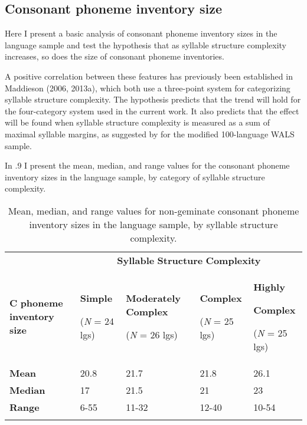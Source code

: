 \subsection{Consonant phoneme inventory size}\label{sec:4.4.1}

  Here I present a basic analysis of consonant phoneme inventory sizes in the language sample and test the hypothesis that as syllable structure complexity increases, so does the size of consonant phoneme inventories.

  A positive correlation between these features has previously been established in Maddieson (2006, 2013a), which both use a three-point system for categorizing syllable structure complexity. The hypothesis predicts that the trend will hold for the four-category system used in the current work. It also predicts that the effect will be found when syllable structure complexity is measured as a sum of maximal syllable margins, as suggested by \citet{Gordon2016} for the modified 100-language WALS sample.

  In .9 I present the mean, median, and range values for the consonant phoneme inventory sizes in the language sample, by category of syllable structure complexity. 

\begin{table}
\begin{tabularx}{\textwidth}{XXXXX}
 & \multicolumn{4}{c}{ \textbf{Syllable} \textbf{Structure} \textbf{Complexity}}\\
\lsptoprule
\textbf{C} \textbf{phoneme} \textbf{inventory} \textbf{size} & { \textbf{Simple}}

 (\textit{N} = 24 lgs) & { \textbf{Moderately} \textbf{Complex}}

 (\textit{N} = 26 lgs) & { \textbf{Complex}}

 (\textit{N} = 25 lgs) & { \textbf{Highly} }

{ \textbf{Complex}}

 (\textit{N} = 25 lgs)\\
\textbf{Mean} & 20.8 & 21.7 & 21.8 & 26.1\\
\textbf{Median} & 17 & 21.5 & 21 & 23\\
\textbf{Range} & 6-55 & 11-32 & 12-40 & 10-54\\
\lspbottomrule
\end{tabularx}
\caption{\label{4.9}Mean, median, and range values for non-geminate consonant phoneme inventory sizes in the language sample, by syllable structure complexity.}
\end{table}

